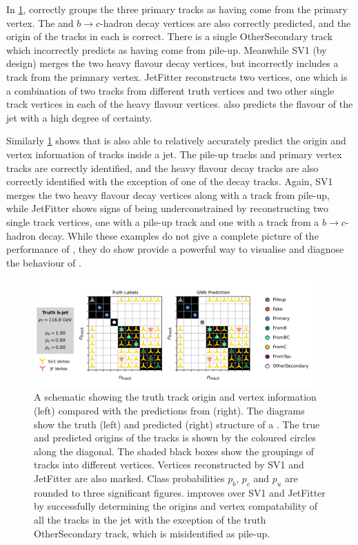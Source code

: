 In \cref{fig:bjet_diag_1}, \GNN correctly groups the three primary tracks as having come from the primary vertex.
The \bhadron and $b\rightarrow c$-hadron decay vertices are also correctly predicted, and the origin of the tracks in each is correct.
There is a single OtherSecondary track which \GNN incorrectly predicts as having come from pile-up.
Meanwhile SV1 (by design) merges the two heavy flavour decay vertices, but incorrectly includes a track from the primnary vertex.
JetFitter reconstructs two vertices, one which is a combination of two tracks from different truth vertices and two other single track vertices in each of the heavy flavour vertices.
\GNN also predicts the flavour of the jet with a high degree of certainty.

Similarly \cref{fig:bjet_diag_1} shows that \GNN is also able to relatively accurately predict the origin and vertex information of tracks inside a jet.
The pile-up tracks and primary vertex tracks are correctly identified, and the heavy flavour decay tracks are also correctly identified with the exception of one of the \bhadron decay tracks.
Again, SV1 merges the two heavy flavour decay vertices along with a track from pile-up, while JetFitter shows signs of being underconstrained by reconstructing two single track vertices, one with a pile-up track and one with a track from a $b\rightarrow c$-hadron decay.
While these examples do not give a complete picture of the performance of \GNN, they do show provide a powerful way to visualise and diagnose the behaviour of \GNN.

\begin{figure}[!p]
    \centering
    \includegraphics[width=0.95\textwidth]{chapters/gnn_tagger/figs/bjet_vertex.pdf}
    \caption{
        A schematic showing the truth track origin and vertex information (left) compared with the predictions from \GNN (right).
        The diagrams show the truth (left) and predicted (right) structure of a \bjet.
        The true and predicted origins of the tracks is shown by the coloured circles along the diagonal.
        The shaded black boxes show the groupings of tracks into different vertices.
        Vertices reconstructed by SV1 and JetFitter are also marked.
        Class probabilities $p_b$, $p_c$ and $p_u$ are rounded to three significant figures.
        \GNN improves over SV1 and JetFitter by successfully determining the origins and vertex compatability of all the tracks in the jet with the exception of the truth OtherSecondary track, which is misidentified as pile-up.
    }
    \label{fig:bjet_diag_1}
 \end{figure}

